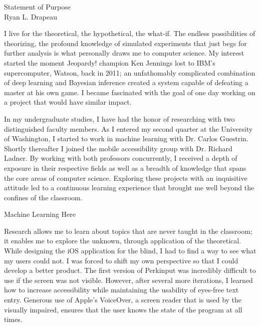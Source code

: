 \setlength{\oddsidemargin}{0in}
\setlength{\evensidemargin}{0in}
\setlength{\textwidth}{6.5in}
\setlength{\topmargin}{-.65in}
\setlength{\textheight}{9in}
\pagestyle{empty}



\begin{center}
    {\Large Statement of Purpose} \\[3 mm]
    {\large Ryan L. Drapeau}
\end{center}

\vspace*{.075in}

I live for the theoretical, the hypothetical, the what-if. The endless possibilities of theorizing, the profound knowledge of simulated experiments that just begs for further analysis is what personally draws me to computer science. My interest started the moment Jeopardy! champion Ken Jennings lost to IBM’s supercomputer, Watson, back in 2011; an unfathomably complicated combination of deep learning and Bayesian inference created a system capable of defeating a master at his own game. I became fascinated with the goal of one day working on a project that would have similar impact.\vspace{3 mm}

In my undergraduate studies, I have had the honor of researching with two distinguished faculty members. As I entered my second quarter at the University of Washington, I started to work in machine learning with Dr. Carlos Guestrin. Shortly thereafter I joined the mobile accessibility group with Dr. Richard Ladner. By working with both professors concurrently, I received a depth of exposure in their respective fields as well as a breadth of knowledge that spans the core areas of computer science. Exploring these projects with an inquisitive attitude led to a continuous learning experience that brought me well beyond the confines of the classroom.\vspace{3 mm}

Machine Learning Here\vspace{3 mm}

Research allows me to learn about topics that are never taught in the classroom; it enables me to explore the unknown, through application of the theoretical. While designing the iOS application for the blind, I had to find a way to see what my users could not. I was forced to shift my own perspective so that I could develop a better product. The first version of Perkinput was incredibly difficult to use if the screen was not visible. However, after several more iterations, I learned how to increase accessibility while maintaining the usability of eyes-free text entry. Generous use of Apple’s VoiceOver, a screen reader that is used by the visually impaired, ensures that the user knows the state of the program at all times.\vspace{3 mm}

